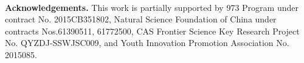 \documentclass[10pt,twocolumn,letterpaper]{article}
\begin{document}
~\\
\noindent \textbf{Acknowledgements.} This work is partially supported by 973 Program under contract No. 2015CB351802, Natural Science Foundation of China under contracts Nos.61390511, 61772500, CAS Frontier Science Key Research Project No. QYZDJ-SSWJSC009, and Youth Innovation Promotion Association No. 2015085.

{\small


}
\end{document}
